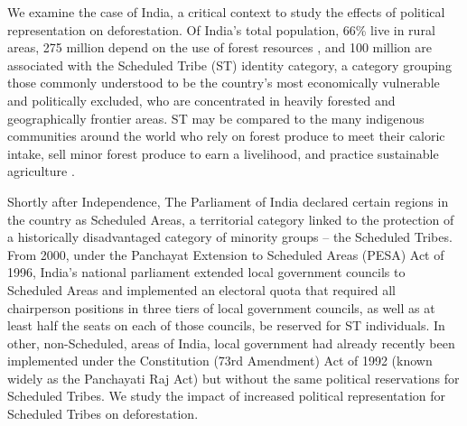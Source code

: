 \documentclass[12pt,reqno]{article}
\begin{document}




We examine the case of India, a critical context to study the effects of political representation on deforestation. Of India's total population, $66$\% live in rural areas, 275 million depend on the use of forest resources \parencite{RupeeFund}, and 100 million are associated with the Scheduled Tribe (ST) identity category, a category grouping those commonly understood to be the country's most economically vulnerable and politically excluded, who  are concentrated in heavily forested and geographically frontier areas. ST may be compared to the many indigenous communities around the world who rely on forest produce to meet their caloric intake, sell minor forest produce to earn a livelihood, and practice sustainable agriculture \parencite{kashwan2017democracy, zimmerman2001conservation}.

Shortly after Independence, The Parliament of India declared certain regions in the country as Scheduled Areas, a territorial category linked to the protection of a historically disadvantaged category of minority groups -- the Scheduled Tribes. From 2000, under the Panchayat Extension to Scheduled Areas (PESA) Act of 1996, India’s national parliament extended local government councils to Scheduled Areas and implemented an electoral quota that required all chairperson positions in three tiers of local government councils, as well as at least half the seats on each of those councils, be reserved for ST individuals. In other, non-Scheduled, areas of India, local government had already recently been implemented under the Constitution (73rd Amendment) Act of 1992 (known widely as the Panchayati Raj Act) but without the same political reservations for Scheduled Tribes. We study the impact of increased political representation for Scheduled Tribes on deforestation. 


\end{document}
